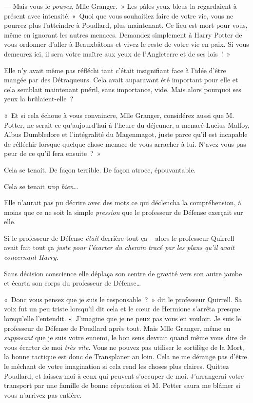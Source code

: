 --- Mais vous le \emph{pouvez}, Mlle Granger.~»
Les pâles yeux bleus la regardaient à présent avec intensité.
«~Quoi que vous souhaitiez faire de votre vie, vous ne pourrez plus l'atteindre à Poudlard, plus maintenant.
Ce lieu est mort pour vous, même en ignorant les autres menaces.
Demandez simplement à Harry Potter de vous ordonner d'aller à Beauxbâtons et vivez le reste de votre vie en paix.
Si vous demeurez ici, il sera votre maître aux yeux de l'Angleterre et de ses lois~!~»

Elle n'y avait même pas réfléchi tant c'était insignifiant face à l'idée d'être mangée par des Détraqueurs.
Cela avait auparavant été important pour elle et cela semblait maintenant puéril, sans importance, vide.
Mais alors pourquoi ses yeux la brûlaient-elle~?

«~Et si cela échoue à vous convaincre, Mlle Granger, considérez aussi que M. Potter, ne serait-ce qu'aujourd'hui à l'heure du déjeuner, a menacé Lucius Malfoy, Albus Dumbledore et l'intégralité du Magenmagot, juste parce qu'il est incapable de réfléchir lorsque quelque chose menace de vous arracher à lui.
N'avez-vous pas peur de ce qu'il fera ensuite~?~»

Cela se tenait.
De façon terrible.
De façon atroce, épouvantable.

Cela se tenait \emph{trop bien}…

Elle n'aurait pas pu décrire avec des mots ce qui déclencha la compréhension, à moins que ce ne soit la simple \emph{pression} que le professeur de Défense exerçait sur elle.

Si le professeur de Défense \emph{était} derrière tout ça -- alors le professeur Quirrell avait fait tout ça \emph{juste pour l'écarter du chemin tracé par les plans qu'il avait concernant Harry.}

Sans décision conscience elle déplaça son centre de gravité vers son autre jambe et écarta son corps du professeur de Défense…

«~Donc vous pensez que je suis le responsable~?~»
dit le professeur Quirrell.
Sa voix fut un peu triste lorsqu'il dit cela et le cœur de Hermione s'arrêta presque lorsqu'elle l'entendit.
«~J'imagine que je ne peux pas vous en vouloir.
Je suis le professeur de Défense de Poudlard après tout.
Mais Mlle Granger, même en \emph{supposant} que je suis votre ennemi, le bon sens devrait quand même vous dire de vous écarter de moi \emph{très vite}.
Vous ne pouvez pas utiliser le sortilège de la Mort, la bonne tactique est donc de Transplaner au loin.
Cela ne me dérange pas d'être le méchant de votre imagination si cela rend les choses plus claires.
Quittez Poudlard, et laissez-moi à ceux qui peuvent s'occuper de moi.
J'arrangerai votre transport par une famille de bonne réputation et M. Potter saura me blâmer si vous n'arrivez pas entière.

